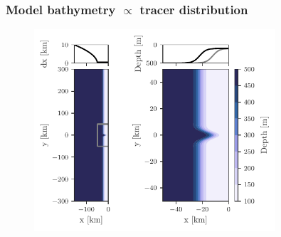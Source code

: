 \documentclass{beamer}
\begin{document}
\begin{frame}
\frametitle{Model bathymetry $\varpropto$ tracer distribution}
\begin{figure}
\centering
\includegraphics[clip, trim=0 0 0 0.3cm, width=0.8\textwidth]{figures/bathymetry.pdf}
\end{figure}
\end{frame}

\end{document}
